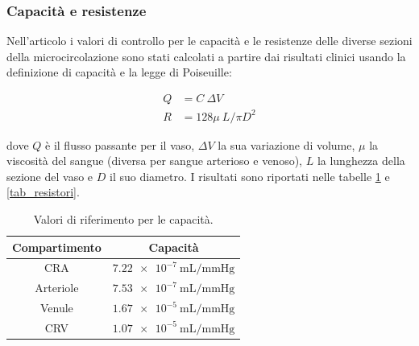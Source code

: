 \documentclass{article}
\begin{document}
\subsubsection*{Capacità e resistenze}
Nell'articolo \cite{art1} i valori di controllo per le capacità e le resistenze delle diverse sezioni della microcircolazione sono stati calcolati a partire dai risultati clinici usando la definizione di capacità e la legge di Poiseuille:
\begin{center}
\begin{equation}
\begin{split}
Q &= C \ \Delta V \\
R &= 128 \mu\ L / \pi D^2
\end{split}
\label{eqcapacity}
\end{equation}
\end{center}
dove $Q$ è il flusso passante per il vaso, $\Delta V$ la sua variazione di volume, $\mu$ la viscosità del sangue (diversa per sangue arterioso e venoso), $L$ la lunghezza della sezione del vaso e $D$ il suo diametro.
I risultati sono riportati nelle tabelle \ref{tab_capacita} e \ref{tab_resistori}.

\begin{table}[h!]
\begin{center}
\begin{tabular}{| c | c |}
\hline
\textbf{Compartimento} & \textbf{Capacità}\\
\hline
CRA & $ \SI{7.22e-7}{\milli \liter \per \mmHg}$ \\
Arteriole & $ \SI{7.53e-7}{\milli \liter \per \mmHg}$ \\
Venule & $\SI{1.67e-5}{\milli \liter \per \mmHg}$ \\
CRV & $\SI{1.07e-5}{\milli \liter \per \mmHg}$ \\
\hline
\end{tabular}
\caption{Valori di riferimento per le capacità.}
\label{tab_capacita}
\end{center}
\end{table}
\end{document}
